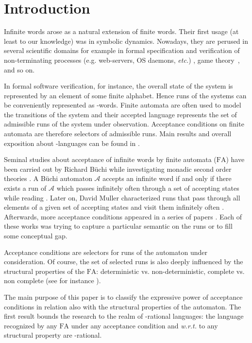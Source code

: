 \documentclass[preprint]{elsarticle}
\makeatletter
\newcommand{\A}{\ensuremath{\mathcal{A}}\xspace}
\newcommand{\etc}{\emph{etc.}\@\xspace}
\newcommand{\wrt}{\emph{w.r.t.}\@\xspace}
\newcommand{\FA}{\ensuremath{\mathrm{FA}}\xspace}
\makeatother
\begin{document}
\section{Introduction}

Infinite words arose as a natural extension of finite words. Their first usage (at least to our knowledge) was in symbolic dynamics.
Nowadays, they are perused in several scientific domains for example in formal specification and verification of non-terminating processes (e.g. web-servers, OS daemons, \etc) \cite{kurshan1994,kupferman2004,vardi2007}, game theory~\cite{apt2011,thomas2011}, and so on.
\smallskip

In formal software verification, for instance,  the overall state of the system
is represented by an element of some finite alphabet. Hence runs of the systems can be conveniently represented as
-words. Finite automata are often used to model the transitions of the system and their accepted
language represents the set of admissible runs of the system under observation. Acceptance conditions
on finite automata are therefore selectors of admissible runs. Main results and overall exposition about  
-languages can be found in \cite{thomas1990,staiger1997,perrin2004}.

Seminal studies about acceptance of infinite words by finite automata (\FA) have been
carried out by Richard B\"uchi while investigating monadic second order theories \cite{Buchi1960}.
A B\"uchi automaton \A  accepts an infinite word  if and only if there exists a run of \A which
passes infinitely often through a set of accepting states while reading . Later on, David Muller 
characterized runs that pass through all elements of a given set of accepting states and visit them infinitely 
often \cite{Muller1963}. Afterwards, more acceptance conditions appeared in a series of papers 
\cite{Hartmanis1967,landweber1969,Staiger1974,Moriya1988,Litovsky1997}. Each of these works was trying to
capture a particular semantic on the runs or to fill some conceptual gap.

Acceptance conditions are selectors for runs of the automaton under consideration. Of course, the set of selected
runs is also deeply influenced by the structural properties of the \FA : deterministic vs. non-deterministic, complete 
vs. non complete (see for instance \cite{Litovsky1997}).

The main purpose of this paper is to classify the expressive power of acceptance conditions in relation also with
the structural properties of the automaton. The first result bounds the research to the realm of -rational
languages: the language recognized by any \FA under any acceptance condition and \wrt to any structural property
are -rational.
\end{document}
